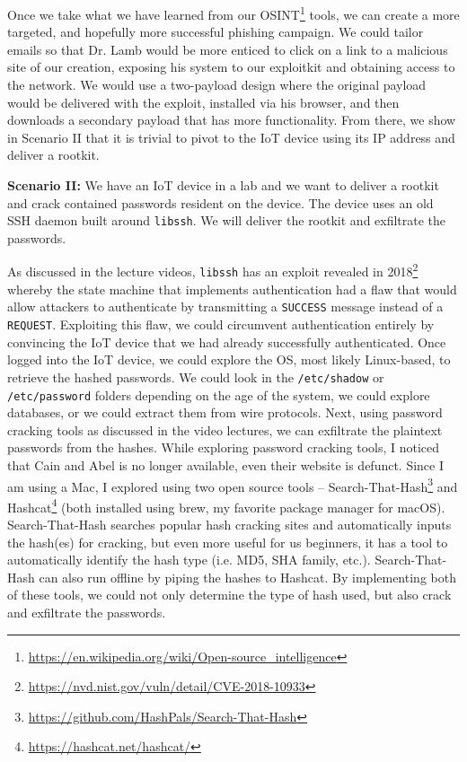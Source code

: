 \documentclass[12pt]{article}
\begin{document}
Once we take what we have learned from our OSINT\footnote{\href{https://en.wikipedia.org/wiki/Open-source_intelligence}{https://en.wikipedia.org/wiki/Open-source\_intelligence}} tools, we can create a more targeted, and hopefully more successful phishing campaign. We could tailor emails so that Dr. Lamb would be more enticed to click on a link to a malicious site of our creation, exposing his system to our exploitkit and obtaining access to the network. We would use a two-payload design where the original payload would be delivered with the exploit, installed via his browser, and then downloads a secondary payload that has more functionality. From there, we show in Scenario II that it is trivial to pivot to the IoT device using its IP address and deliver a rootkit.

\textbf{Scenario II:}
We have an IoT device in a lab and we want to deliver a rootkit and crack contained passwords resident on the device. The device uses an old SSH daemon built around \texttt{libssh}. We will deliver the rootkit and exfiltrate the passwords.

As discussed in the lecture videos, \texttt{libssh} has an exploit revealed in 2018\footnote{\href{https://nvd.nist.gov/vuln/detail/CVE-2018-10933}{https://nvd.nist.gov/vuln/detail/CVE-2018-10933}} whereby the state machine that implements authentication had a flaw that would allow attackers to authenticate by transmitting a \texttt{SUCCESS} message instead of a \texttt{REQUEST}. Exploiting this flaw, we could circumvent authentication entirely by convincing the IoT device that we had already successfully authenticated. Once logged into the IoT device, we could explore the OS, most likely Linux-based, to retrieve the hashed passwords. We could look in the \texttt{/etc/shadow} or \texttt{/etc/password} folders depending on the age of the system, we could explore databases, or we could extract them from wire protocols.
Next, using password cracking tools as discussed in the video lectures, we can exfiltrate the plaintext passwords from the hashes. While exploring password cracking tools, I noticed that Cain and Abel is no longer available, even their website is defunct. Since I am using a Mac, I explored using two open source tools -- Search-That-Hash\footnote{\href{https://github.com/HashPals/Search-That-Hash}{https://github.com/HashPals/Search-That-Hash}} and Hashcat\footnote{\href{https://hashcat.net/hashcat/}{https://hashcat.net/hashcat/}} (both installed using brew, my favorite package manager for macOS). Search-That-Hash searches popular hash cracking sites and automatically inputs the hash(es) for cracking, but even more useful for us beginners, it has a tool to automatically identify the hash type (i.e. MD5, SHA family, etc.). Search-That-Hash can also run offline by piping the hashes to Hashcat. By implementing both of these tools, we could not only determine the type of hash used, but also crack and exfiltrate the passwords.
\end{document}
